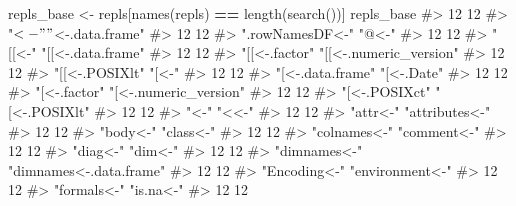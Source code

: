 \documentclass[
]{krantz}
\makeatletter
\newenvironment{Shaded}{\begin{snugshade}}{\end{snugshade}}
\newcommand{\CommentTok}[1]{\textcolor[rgb]{0.56,0.35,0.01}{\textit{#1}}}
\newcommand{\KeywordTok}[1]{\textcolor[rgb]{0.13,0.29,0.53}{\textbf{#1}}}
\newcommand{\NormalTok}[1]{#1}
\newcommand{\OperatorTok}[1]{\textcolor[rgb]{0.81,0.36,0.00}{\textbf{#1}}}
\newcommand{\StringTok}[1]{\textcolor[rgb]{0.31,0.60,0.02}{#1}}
\newenvironment{kframe}{%
\medskip{}
\setlength{\fboxsep}{.8em}
 \def\at@end@of@kframe{}%
 \ifinner\ifhmode%
  \def\at@end@of@kframe{\end{minipage}}%
  \begin{minipage}{\columnwidth}%
 \fi\fi%
 \def\FrameCommand##1{\hskip\@totalleftmargin \hskip-\fboxsep
 \colorbox{shadecolor}{##1}\hskip-\fboxsep
     \hskip-\linewidth \hskip-\@totalleftmargin \hskip\columnwidth}%
 \MakeFramed {\advance\hsize-\width
   \@totalleftmargin\z@ \linewidth\hsize
   \@setminipage}}%
 {\par\unskip\endMakeFramed%
 \at@end@of@kframe}
\renewenvironment{Shaded}{\begin{kframe}}{\end{kframe}}
\renewcommand{\KeywordTok} [1]{\textcolor[rgb]{0.00,0.44,0.13}{{#1}}}
\renewcommand{\StringTok}  [1]{\textcolor[rgb]{0.25,0.44,0.63}{{#1}}}
\renewcommand{\CommentTok} [1]{\textcolor[rgb]{0.38,0.63,0.69}{{#1}}}
\renewcommand{\NormalTok}  [1]{{#1}}
\makeatother
\begin{document}
\begin{Shaded}
\begin{Highlighting}[]
\NormalTok{repls_base <-}\StringTok{ }\NormalTok{repls[}\KeywordTok{names}\NormalTok{(repls) }\OperatorTok{==}\StringTok{ }\KeywordTok{length}\NormalTok{(}\KeywordTok{search}\NormalTok{())]}
\NormalTok{repls_base}
\CommentTok{#>                        12                        12 }
\CommentTok{#>                     "$<-"          "$<-.data.frame" }
\CommentTok{#>                        12                        12 }
\CommentTok{#>           ".rowNamesDF<-"                     "@<-" }
\CommentTok{#>                        12                        12 }
\CommentTok{#>                    "[[<-"         "[[<-.data.frame" }
\CommentTok{#>                        12                        12 }
\CommentTok{#>             "[[<-.factor"    "[[<-.numeric_version" }
\CommentTok{#>                        12                        12 }
\CommentTok{#>            "[[<-.POSIXlt"                     "[<-" }
\CommentTok{#>                        12                        12 }
\CommentTok{#>          "[<-.data.frame"                "[<-.Date" }
\CommentTok{#>                        12                        12 }
\CommentTok{#>              "[<-.factor"     "[<-.numeric_version" }
\CommentTok{#>                        12                        12 }
\CommentTok{#>             "[<-.POSIXct"             "[<-.POSIXlt" }
\CommentTok{#>                        12                        12 }
\CommentTok{#>                      "<-"                     "<<-" }
\CommentTok{#>                        12                        12 }
\CommentTok{#>                  "attr<-"            "attributes<-" }
\CommentTok{#>                        12                        12 }
\CommentTok{#>                  "body<-"                 "class<-" }
\CommentTok{#>                        12                        12 }
\CommentTok{#>              "colnames<-"               "comment<-" }
\CommentTok{#>                        12                        12 }
\CommentTok{#>                  "diag<-"                   "dim<-" }
\CommentTok{#>                        12                        12 }
\CommentTok{#>              "dimnames<-"   "dimnames<-.data.frame" }
\CommentTok{#>                        12                        12 }
\CommentTok{#>              "Encoding<-"           "environment<-" }
\CommentTok{#>                        12                        12 }
\CommentTok{#>               "formals<-"                 "is.na<-" }
\CommentTok{#>                        12                        12 }

\end{Highlighting}
\end{Shaded}
\end{document}
